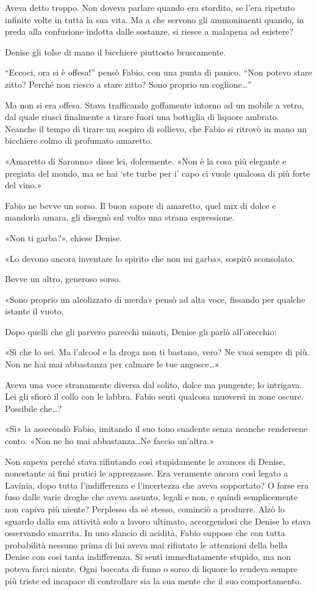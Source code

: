 Aveva detto troppo. Non doveva parlare quando era stordito, se l'era ripetuto infinite volte in tutta la sua vita. Ma a che servono gli ammonimenti quando, in preda alla confusione indotta dalle sostanze, si riesce a malapena ad esistere?

Denise gli tolse di mano il bicchiere piuttosto bruscamente.

``Eccoci, ora si è offesa!'' pensò Fabio, con una punta di panico. ``Non potevo stare zitto? Perché non riesco a stare zitto? Sono proprio un coglione\ldots''

Ma non si era offesa. Stava trafficando goffamente intorno ad un mobile a vetro, dal quale riuscì finalmente a tirare fuori una bottiglia di liquore ambrato. Neanche il tempo di tirare un sospiro di sollievo, che Fabio si ritrovò in mano un bicchiere colmo di profumato amaretto.

«Amaretto di Saronno» disse lei, dolcemente. «Non è la cosa più elegante e pregiata del mondo, ma se hai `ste turbe per i' capo ci vuole qualcosa di più forte del vino.»

Fabio ne bevve un sorso. Il buon sapore di amaretto, quel mix di dolce e mandorla amara, gli disegnò sul volto una strana espressione.

«Non ti garba?», chiese Denise.

«Lo devono ancora inventare lo spirito che non mi garba», sospirò sconsolato.

Bevve un altro, generoso sorso.

«Sono proprio un alcolizzato di merda» pensò ad alta voce, fissando per qualche istante il vuoto.

Dopo quelli che gli parvero parecchi minuti, Denise gli parlò all'orecchio:

«Sì che lo sei. Ma l'alcool e la droga non ti bastano, vero? Ne vuoi sempre di più. Non ne hai mai abbastanza per calmare le tue angosce\ldots»

Aveva una voce stranamente diversa dal solito, dolce ma pungente; lo intrigava. Lei gli sfiorò il collo con le labbra. Fabio sentì qualcosa muoversi in zone oscure. Possibile che\ldots?

«Sì» la assecondò Fabio, imitando il suo tono suadente senza neanche rendersene conto. «Non ne ho mai abbastanza\ldots Ne faccio un'altra.»

Non sapeva perché stava rifiutando così stupidamente le avances di Denise, nonostante ai fini pratici le apprezzasse. Era veramente ancora così legato a Lavinia, dopo tutta l'indifferenza e l'incertezza che aveva sopportato? O forse era fuso dalle varie droghe che aveva assunto, legali e non, e quindi semplicemente non capiva più niente? Perplesso da sé stesso, cominciò a produrre. Alzò lo sguardo dalla sua attività solo a lavoro ultimato, accorgendosi che Denise lo stava osservando smarrita. In uno slancio di acidità, Fabio suppose che con tutta probabilità nessuno prima di lui aveva mai rifiutato le attenzioni della bella Denise con così tanta indifferenza. Si sentì immediatamente stupido, ma non poteva farci niente. Ogni boccata di fumo o sorso di liquore lo rendeva sempre più triste ed incapace di controllare sia la sua mente che il suo comportamento.

